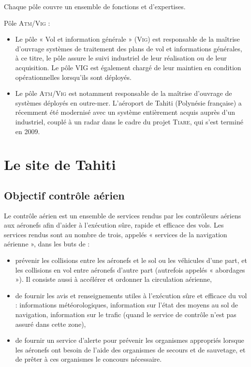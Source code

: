 Chaque pôle couvre un ensemble de fonctions et d’expertises.

Pôle \textsc{Atm/Vig} :
\begin{itemize}
    \item Le pôle « Vol et information générale » (\textsc{Vig}) est responsable de la maîtrise d’ouvrage systèmes de traitement des plans de vol et informations générales, à ce titre, le pôle assure le suivi industriel de leur réalisation ou de leur acquisition. Le pôle VIG est également chargé de leur maintien en condition opérationnelles lorsqu’ils sont déployés.
    \item Le pôle \textsc{Atm/Vig} est notamment responsable de la maîtrise d’ouvrage de systèmes déployés en outre-mer. L’aéroport de Tahiti (Polynésie française) a récemment été modernisé avec un système entièrement acquis auprès d’un industriel, couplé à un radar dans le cadre du projet \textsc{Tiare}, qui s’est terminé en 2009.
\end{itemize}\medskip


\section{Le site de Tahiti}
    \subsection{Objectif contrôle aérien}
Le contrôle aérien est un ensemble de services  rendus par les contrôleurs aériens aux aéronefs afin d'aider à l'exécution sûre, rapide et efficace des vols. Les services rendus sont au nombre de trois, appelés « services de la navigation aérienne », dans les buts de :
\begin{itemize}
    \item prévenir les collisions entre les aéronefs et le sol ou les véhicules d'une part, et les collisions en vol entre aéronefs d'autre part (autrefois appelés « abordages »). Il consiste aussi à accélérer et ordonner la circulation aérienne,
    \item de fournir les avis et renseignements utiles à l'exécution sûre et efficace du vol : informations météorologiques, information sur l'état des moyens au sol de navigation, information sur le trafic (quand le service de contrôle n'est pas assuré dans cette zone),
    \item de fournir un service d'alerte pour prévenir les organismes appropriés lorsque les aéronefs ont besoin de l'aide des organismes de secours et de sauvetage, et de prêter à ces organismes le concours nécessaire.
\end{itemize}\medskip

